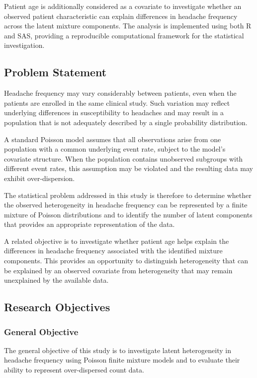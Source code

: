 Patient age is additionally considered as a covariate to investigate whether
an observed patient characteristic can explain differences in headache
frequency across the latent mixture components. The analysis is implemented
using both R and SAS, providing a reproducible computational framework for
the statistical investigation.

\subsection{Problem Statement}

Headache frequency may vary considerably between patients, even when the
patients are enrolled in the same clinical study. Such variation may reflect
underlying differences in susceptibility to headaches and may result in a
population that is not adequately described by a single probability
distribution.

A standard Poisson model assumes that all observations arise from one
population with a common underlying event rate, subject to the model's
covariate structure. When the population contains unobserved subgroups with
different event rates, this assumption may be violated and the resulting data
may exhibit over-dispersion.

The statistical problem addressed in this study is therefore to determine
whether the observed heterogeneity in headache frequency can be represented
by a finite mixture of Poisson distributions and to identify the number of
latent components that provides an appropriate representation of the data.

A related objective is to investigate whether patient age helps explain the
differences in headache frequency associated with the identified mixture
components. This provides an opportunity to distinguish heterogeneity that
can be explained by an observed covariate from heterogeneity that may remain
unexplained by the available data.

\subsection{Research Objectives}

\subsubsection{General Objective}

The general objective of this study is to investigate latent heterogeneity in
headache frequency using Poisson finite mixture models and to evaluate their
ability to represent over-dispersed count data.

